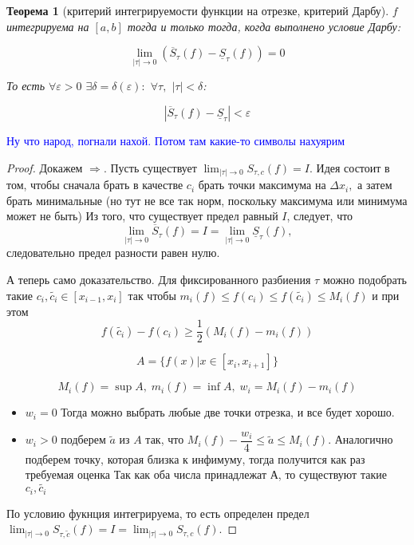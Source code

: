 \documentclass{article}
\theoremstyle{plain}
\newtheorem{theorem}{Теорема}
\theoremstyle{definition}
\theoremstyle{remark}
\begin{document}
\begin{theorem}[критерий интегрируемости функции на отрезке, критерий Дарбу]
$f$ интегрируема на $[a, b]$ тогда и только тогда, когда выполнено условие Дарбу:

$$\lim_{|\tau| \to 0} (\overline{S}_{\tau}(f) - \underline{S}_{\tau}(f)) = 0$$


То есть $\forall \varepsilon > 0$ $\exists \delta = \delta(\varepsilon):$ $\forall \tau,$ $|\tau| < \delta$:

$$|\overline{S}_{\tau}(f) - \underline{S}_{\tau}| < \varepsilon$$



\end{theorem}
\textcolor{blue}{Ну что народ, погнали нахой. Потом там какие-то символы нахуярим}
\begin{proof}
Докажем $\Rightarrow.$ Пусть существует $\lim_{|\tau| \to 0} S_{\tau, c}(f) = I.$ Идея состоит в том, чтобы сначала брать в качестве $c_i$ брать точки максимума на $\Delta x_i,$ а затем брать минимальные (но тут не все так норм, поскольку максимума или минимума может не быть) Из того, что существует предел равный $I$, следует, что $$\lim_{|\tau| \to 0}\overline{S}_{\tau}(f) = I = \lim_{|\tau| \to 0}\underline{S}_{\tau}(f),$$ следовательно предел разности равен нулю. 

А теперь само доказательство. Для фиксированного разбиения $\tau$ можно подобрать такие $c_i, \widetilde{c_i} \in [x_{i-1}, x_{i}]$ так чтобы $m_i(f) \leq f(c_i) \leq f(\widetilde{c_i}) \leq M_i(f)$ и при этом 
\begin{equation}\label{eq1}
   f(\widetilde{c_i}) - f(c_i) \geq \frac{1}{2}(M_i(f) - m_i(f)) 
\end{equation}

$$A=\{f(x) | x\in [x_i, x_{i+1}]\}$$

$$M_i(f) = \sup A, \;m_i(f) = \inf A,\; w_i = M_i(f) - m_i(f)$$

\begin{itemize}
    \item $w_i = 0$ Тогда можно выбрать любые две точки отрезка, и все будет хорошо.
    \item $w_i > 0$ подберем $\widetilde{a}$ из $A$  так, что  $M_i(f) - \dfrac{w_i}{4} \leq \widetilde{a} \leq M_i(f).$ Аналогично подберем точку, которая близка к инфимуму, тогда получится как раз требуемая оценка Так как оба числа принадлежат А, то существуют такие $c_i, \widetilde{c_i}$
\end{itemize}
По условию фукнция интегрируема, то есть определен предел $\lim_{|\tau| \to 0} S_{\tau, \widetilde{c}}(f) = I = \lim_{|\tau| \to 0}S_{\tau, c}(f)$.


\end{proof}
\end{document}
